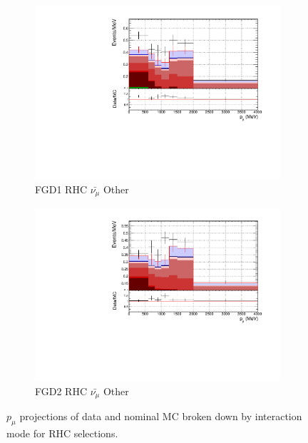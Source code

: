\begin{figure}[!h]
\begin{subfigure}{0.49\textwidth}
  \centering
  \includegraphics[width=\textwidth]{figs/FGD1_anti-numuCC_other_p}
  \caption{FGD1 RHC $\bar{\nu_{\mu}}$ Other}
\end{subfigure}
\begin{subfigure}{0.49\textwidth}
  \centering
  \includegraphics[width=\textwidth]{figs/FGD2_anti-numuCC_other_p}
  \caption{FGD2 RHC $\bar{\nu_{\mu}}$ Other}
\end{subfigure}
\caption{$p_{\mu}$ projections of data and nominal MC broken down by interaction mode for RHC \numub selections.}
\label{fig:pstack_rhc_numub}
\end{figure}


